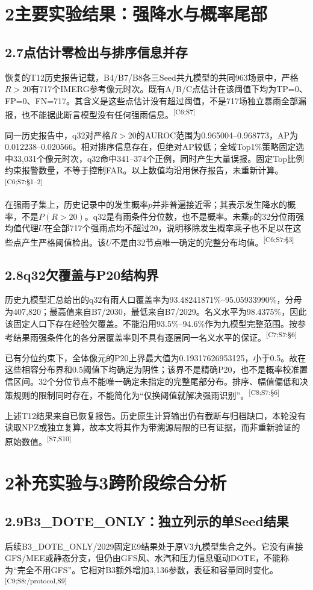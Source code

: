 \documentclass[UTF8,10.5pt,a4paper,fontset=none]{ctexart}
\newcommand{\evi}[1]{\textsuperscript{\textcolor{muted}{[#1]}}}
\newcommand{\nextpart}[1]{\clearpage\section*{#1}}
\begin{document}
\nextpart{2\quad 主要实验结果：强降水与概率尾部}
\subsection*{2.7\quad 点估计零检出与排序信息并存}
恢复的T12历史报告记载，B4/B7/B8各三Seed共九模型的共同963场景中，严格$R>20$有717个IMERG参考像元时次。既有A/B/C点估计在该阈值下均为TP=0、FP=0、FN=717。其含义是这些点估计没有超过阈值，不是717场独立暴雨全部漏报，也不能据此断言模型没有任何强雨信息。\evi{C6;S7}

同一历史报告中，q32对严格$R>20$的AUROC范围为0.965004--0.968773，AP为0.012238--0.020566。相对排序信息存在，但绝对AP较低；全域Top1\%策略固定选中33,031个像元时次，q32命中341--374个正例，同时产生大量误报。固定Top比例约束报警数量，不等于控制FAR。以上数值均沿用保存报告，未重新计算。\evi{C6;S7:§1--2}

在强雨子集上，历史记录中的发生概率$p$并非普遍接近零；其表示发生降水的概率，不是$P(R>20)$。q32是有雨条件分位数，也不是概率。未乘$p$的32分位雨强均值代理$U$在全部717个强雨点均不超过20，说明移除发生概率乘子也不足以在这些点产生严格阈值检出。该$U$不是由32节点唯一确定的完整分布均值。\evi{C6;S7:§3}

\subsection*{2.8\quad q32欠覆盖与P20结构界}
历史九模型汇总给出的q32有雨人口覆盖率为93.48241871\%--95.05933990\%，分母为407,820；最高值来自B7/2030，最低来自B7/2029。名义水平为98.4375\%，因此该固定人口下存在经验欠覆盖。不能沿用93.5\%--94.6\%作为九模型完整范围。按参考结果雨强条件化的各分层覆盖率则不具有逐层同一名义水平的保证。\evi{C7;S7:§6}

已有分位约束下，全体像元的P20上界最大值为0.19317626953125，小于0.5。故在这些相容分布界和0.5阈值下均确定为阴性；该界不是精确P20，也不是概率校准置信区间。32个分位节点不能唯一确定未指定的完整尾部分布。排序、幅值偏低和决策规则的限制同时存在，不能简化为“仅换阈值就解决强雨识别”。\evi{C8;S7:§6}

上述T12结果来自已恢复报告。历史原生计算输出仍有截断与归档缺口，本轮没有读取NPZ或独立复算，故本文将其作为带溯源局限的已有证据，而非重新验证的原始数值。\evi{S7,S10}

\nextpart{2\quad 补充实验与3\quad 跨阶段综合分析}
\subsection*{2.9\quad B3\_DOTE\_ONLY：独立列示的单Seed结果}
后续B3\_DOTE\_ONLY/2029固定E9结果处于原V3九模型集合之外。它没有直接GFS/MEE或静态分支，但仍由GFS风、水汽和压力信息驱动DOTE，不能称为“完全不用GFS”。它相对B3额外增加3,136参数，表征和容量同时变化。\evi{C9;S8:/protocol,S9}
\end{document}
